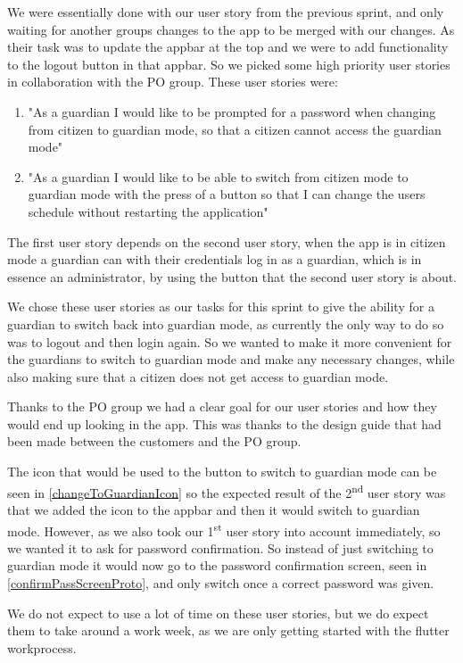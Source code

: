 We were essentially done with our user story from the previous sprint, and only waiting for another groups changes to the app to be merged with our changes. 
As their task was to update the appbar at the top and we were to add functionality to the logout button in that appbar.
So we picked some high priority user stories in collaboration with the PO group.
These user stories were:

\begin{enumerate}
\item "As a guardian I would like to be prompted for a password when changing from citizen to guardian mode, so that a citizen cannot access the guardian mode"
\item "As a guardian I would like to be able to switch from citizen mode to guardian mode with the press of a button so that I can change the users schedule without restarting the application"
\end{enumerate}

The first user story depends on the second user story, when the app is in citizen mode a guardian can with their credentials log in as a guardian, which is in essence an administrator, by using the button that the second user story is about. 

We chose these user stories as our tasks for this sprint to give the ability for a guardian to switch back into guardian mode, as currently the only way to do so was to logout and then login again. 
So we wanted to make it more convenient for the guardians to switch to guardian mode and make any necessary changes, while also making sure that a citizen does not get access to guardian mode.

Thanks to the PO group we had a clear goal for our user stories and how they would end up looking in the app. 
This was thanks to the design guide that had been made between the customers and the PO group.

The icon that would be used to the button to switch to guardian mode can be seen in \ref{changeToGuardianIcon} so the expected result of the 2\textsuperscript{nd} user story was that we added the icon to the appbar and then it would switch to guardian mode. 
However, as we also took our 1\textsuperscript{st} user story into account immediately, so we wanted it to ask for password confirmation. 
So instead of just switching to guardian mode it would now go to the password confirmation screen, seen in \ref{confirmPassScreenProto}, and only switch once a correct password was given.


We do not expect to use a lot of time on these user stories, but we do expect them to take around a work week, as we are only getting started with the flutter workprocess.
